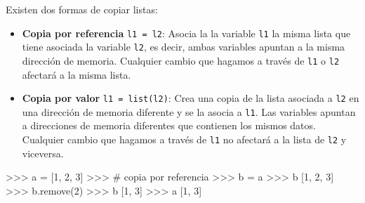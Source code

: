 \documentclass[
  spanish,
  a4paper,
]{scrreport}
\newenvironment{Shaded}{\begin{snugshade}}{\end{snugshade}}
\newcommand{\CommentTok}[1]{\textcolor[rgb]{0.37,0.37,0.37}{#1}}
\newcommand{\DecValTok}[1]{\textcolor[rgb]{0.68,0.00,0.00}{#1}}
\newcommand{\NormalTok}[1]{\textcolor[rgb]{0.00,0.23,0.31}{#1}}
\newcommand{\OperatorTok}[1]{\textcolor[rgb]{0.37,0.37,0.37}{#1}}
\providecommand{\tightlist}{%
  \setlength{\itemsep}{0pt}\setlength{\parskip}{0pt}}
\begin{document}
Existen dos formas de copiar listas:

\begin{itemize}
\tightlist
\item
  \textbf{Copia por referencia} \texttt{l1\ =\ l2}: Asocia la la
  variable \texttt{l1} la misma lista que tiene asociada la variable
  \texttt{l2}, es decir, ambas variables apuntan a la misma dirección de
  memoria. Cualquier cambio que hagamos a través de \texttt{l1} o
  \texttt{l2} afectará a la misma lista.
\item
  \textbf{Copia por valor} \texttt{l1\ =\ list(l2)}: Crea una copia de
  la lista asociada a \texttt{l2} en una dirección de memoria diferente
  y se la asocia a \texttt{l1}. Las variables apuntan a direcciones de
  memoria diferentes que contienen los mismos datos. Cualquier cambio
  que hagamos a través de \texttt{l1} no afectará a la lista de
  \texttt{l2} y viceversa.
\end{itemize}

\begin{Shaded}
\begin{Highlighting}[]
\OperatorTok{\textgreater{}\textgreater{}\textgreater{}}\NormalTok{ a }\OperatorTok{=}\NormalTok{ [}\DecValTok{1}\NormalTok{, }\DecValTok{2}\NormalTok{, }\DecValTok{3}\NormalTok{]}
\OperatorTok{\textgreater{}\textgreater{}\textgreater{}} \CommentTok{\# copia por referencia}
\OperatorTok{\textgreater{}\textgreater{}\textgreater{}}\NormalTok{ b }\OperatorTok{=}\NormalTok{ a}
\OperatorTok{\textgreater{}\textgreater{}\textgreater{}}\NormalTok{ b}
\NormalTok{[}\DecValTok{1}\NormalTok{, }\DecValTok{2}\NormalTok{, }\DecValTok{3}\NormalTok{]}
\OperatorTok{\textgreater{}\textgreater{}\textgreater{}}\NormalTok{ b.remove(}\DecValTok{2}\NormalTok{)}
\OperatorTok{\textgreater{}\textgreater{}\textgreater{}}\NormalTok{ b}
\NormalTok{[}\DecValTok{1}\NormalTok{, }\DecValTok{3}\NormalTok{]}
\OperatorTok{\textgreater{}\textgreater{}\textgreater{}}\NormalTok{ a}
\NormalTok{[}\DecValTok{1}\NormalTok{, }\DecValTok{3}\NormalTok{]}
\end{Highlighting}
\end{Shaded}
\end{document}
